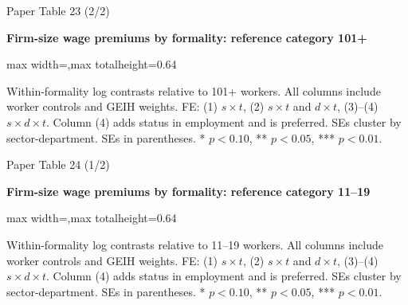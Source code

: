 \begin{frame}{Paper Table 23 (2/2)}
\begin{minipage}{\textwidth}\small\textbf{Firm-size wage premiums by formality: reference category 101+}\end{minipage}\par\vspace{0.15cm}
\centering\begingroup\fontsize{8.5}{10}\selectfont
\setlength{\tabcolsep}{4pt}\renewcommand{\arraystretch}{1.06}
\begin{adjustbox}{max width=\textwidth,max totalheight=0.64\textheight}

\end{adjustbox}\endgroup\par\vspace{0.10cm}
{\fontsize{6.5}{7.5}\selectfont\raggedright Within-formality log contrasts relative to 101+ workers. All columns include worker controls and GEIH weights. FE: (1) $s\times t$, (2) $s\times t$ and $d\times t$, (3)--(4) $s\times d\times t$. Column (4) adds status in employment and is preferred. SEs cluster by sector-department. SEs in parentheses. * $p<0.10$, ** $p<0.05$, *** $p<0.01$.\par}
\end{frame}

\begin{frame}{Paper Table 24 (1/2)}
\begin{minipage}{\textwidth}\small\textbf{Firm-size wage premiums by formality: reference category 11--19}\end{minipage}\par\vspace{0.15cm}
\centering\begingroup\fontsize{8.5}{10}\selectfont
\setlength{\tabcolsep}{4pt}\renewcommand{\arraystretch}{1.06}
\begin{adjustbox}{max width=\textwidth,max totalheight=0.64\textheight}

\end{adjustbox}\endgroup\par\vspace{0.10cm}
{\fontsize{6.5}{7.5}\selectfont\raggedright Within-formality log contrasts relative to 11--19 workers. All columns include worker controls and GEIH weights. FE: (1) $s\times t$, (2) $s\times t$ and $d\times t$, (3)--(4) $s\times d\times t$. Column (4) adds status in employment and is preferred. SEs cluster by sector-department. SEs in parentheses. * $p<0.10$, ** $p<0.05$, *** $p<0.01$.\par}
\end{frame}

